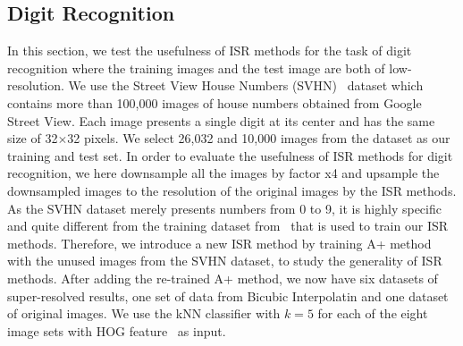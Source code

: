 \documentclass[10pt,twocolumn,letterpaper]{article}
\begin{document}
\subsection{Digit Recognition}
\label{sec:dr}
In this section, we test the usefulness of ISR methods for the task of digit recognition where the training images and the test image are both of low-resolution.  
We use the Street View House Numbers (SVHN)~\cite{37648} dataset which contains more than 100,000 images of house numbers obtained from Google Street View. Each image presents a single digit at its center and has the same size of 32$\times$32 pixels. 
We select 26,032 and 10,000 images from the dataset as our training and test set. 
In order to evaluate the usefulness of ISR methods for digit recognition, we here downsample all the images by factor x4 and upsample the downsampled images to the resolution of the original images by the ISR methods.
As the SVHN dataset merely presents numbers from 0 to 9, it is highly specific and quite different from the training dataset  from~\cite{Yang-TIP-2010} that is used to train our ISR methods. Therefore, we introduce a new ISR method by training A+ method with the unused images from the SVHN dataset, to study the generality of ISR methods. After adding the re-trained A+ method, we now have six datasets of super-resolved results, one set of data from Bicubic Interpolatin and one dataset of original images. 
We use the kNN classifier with $k=5$ for each of the eight image sets with HOG feature~\cite{Dalal_HoG} as input. 


\end{document}
